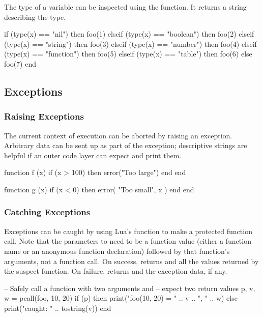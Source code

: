 The type of a variable can be inspected using the  function.  It
returns a string describing the type.

\begin{LuaCode}
if (type(x) == "nil") then
	foo(1)
elseif (type(x) == "boolean") then
	foo(2)
elseif (type(x) == "string") then
	foo(3)
elseif (type(x) == "number") then
	foo(4)
elseif (type(x) == "function") then
	foo(5)
elseif (type(x) == "table") then
	foo(6)
else
	foo(7)
end
\end{LuaCode}

\subsection{Exceptions}
\label{sec:LuaExceptions}

\subsubsection{Raising Exceptions}

The current context of execution can be aborted by raising an exception.
Arbitrary data can be sent up as part of the exception; descriptive strings are
helpful if an outer code layer can expect and print them.

\begin{LuaCode}
function f (x)
	if (x > 100) then
		error("Too large")
	end
end
\end{LuaCode}

\begin{LuaCode}
function g (x)
	if (x < 0) then
		error({ "Too small", x })
	end
end
\end{LuaCode}

\subsubsection{Catching Exceptions}

Exceptions can be caught by using Lua's  function to make a
protected function call.  Note that the parameters to  need to be a
function value (either a function name or an anonymous function declaration)
followed by that function's arguments, not a function call.  On success,
 returns  and all the values returned by the suspect
function.  On failure,  returns  and the exception
data, if any.

\begin{LuaCode}
-- Safely call a function with two arguments and
-- expect two return values
p, v, w = pcall(foo, 10, 20)
if (p) then
	print("foo(10, 20) = " .. v .. ", " .. w)
else
	print("caught: " .. tostring(v))
end
\end{LuaCode}

